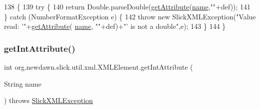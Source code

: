 \begin{DoxyCode}
138                                                                                        \{
139         \textcolor{keywordflow}{try} \{
140             \textcolor{keywordflow}{return} Double.parseDouble(\mbox{\hyperlink{classorg_1_1newdawn_1_1slick_1_1util_1_1xml_1_1_x_m_l_element_a49543d209f2f2709c8e7a88fac034c69}{getAttribute}}(\mbox{\hyperlink{classorg_1_1newdawn_1_1slick_1_1util_1_1xml_1_1_x_m_l_element_aa96123a88e2614952c4d3d1a4207560a}{name}},\textcolor{stringliteral}{""}+def));
141         \} \textcolor{keywordflow}{catch} (NumberFormatException e) \{
142             \textcolor{keywordflow}{throw} \textcolor{keyword}{new} SlickXMLException(\textcolor{stringliteral}{"Value read: '"}+\mbox{\hyperlink{classorg_1_1newdawn_1_1slick_1_1util_1_1xml_1_1_x_m_l_element_a49543d209f2f2709c8e7a88fac034c69}{getAttribute}}(
      \mbox{\hyperlink{classorg_1_1newdawn_1_1slick_1_1util_1_1xml_1_1_x_m_l_element_aa96123a88e2614952c4d3d1a4207560a}{name}}, \textcolor{stringliteral}{""}+def)+\textcolor{stringliteral}{"' is not a double"},e);
143         \}
144     \}
\end{DoxyCode}
\mbox{\label{classorg_1_1newdawn_1_1slick_1_1util_1_1xml_1_1_x_m_l_element_ad19603eb104b78c62788b058b2f2e2c5}} 
\subsubsection{\texorpdfstring{get\+Int\+Attribute()}{getIntAttribute()}\hspace{0.1cm}{\footnotesize\ttfamily [1/2]}}
{\footnotesize\ttfamily int org.\+newdawn.\+slick.\+util.\+xml.\+X\+M\+L\+Element.\+get\+Int\+Attribute (\begin{DoxyParamCaption}\item[{String}]{name }\end{DoxyParamCaption}) throws \mbox{\hyperlink{classorg_1_1newdawn_1_1slick_1_1util_1_1xml_1_1_slick_x_m_l_exception}{Slick\+X\+M\+L\+Exception}}\hspace{0.3cm}{\ttfamily [inline]}}

